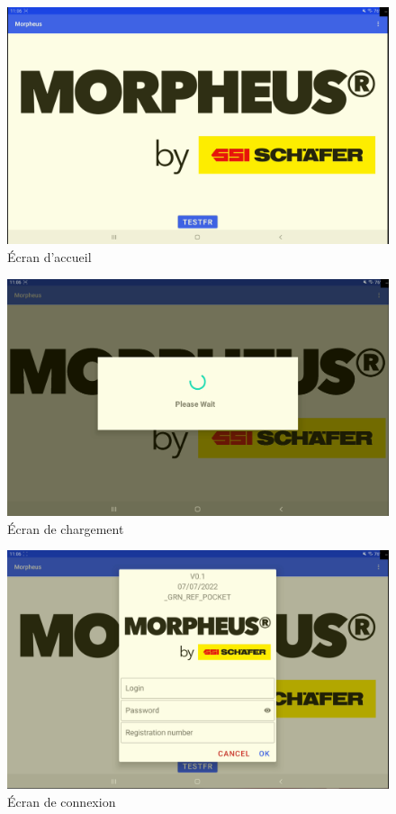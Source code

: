 \documentclass[a4paper, 12pt, french]{article}
\begin{document}
		\newpage

			\begin{figure}[h!]
				\begin{center}
					\includegraphics[width=0.7\linewidth]{application/home.PNG}
				\end{center}
				\caption{Écran d'accueil}
				\label{fig:applications:home}
			\end{figure}	

			\vfill

			\begin{figure}[h!]
				\begin{center}
					\includegraphics[width=0.7\linewidth]{application/loading.PNG}
				\end{center}
				\caption{Écran de chargement}
				\label{fig:applications:loading}
			\end{figure}	

		\newpage

			\begin{figure}[h!]
				\begin{center}
					\includegraphics[width=0.7\linewidth]{application/login.PNG}
				\end{center}
				\caption{Écran de connexion}
				\label{fig:applications:login}
			\end{figure}	
\end{document}
